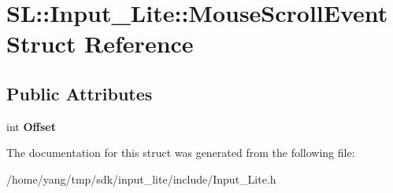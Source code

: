 \hypertarget{struct_s_l_1_1_input___lite_1_1_mouse_scroll_event}{}\section{SL\+:\+:Input\+\_\+\+Lite\+:\+:Mouse\+Scroll\+Event Struct Reference}
\label{struct_s_l_1_1_input___lite_1_1_mouse_scroll_event}
\subsection*{Public Attributes}
\begin{DoxyCompactItemize}
\item 
int {\bfseries Offset}\hypertarget{struct_s_l_1_1_input___lite_1_1_mouse_scroll_event_a08e15d1f6b5fc5f7c6b8c620dfe52584}{}\label{struct_s_l_1_1_input___lite_1_1_mouse_scroll_event_a08e15d1f6b5fc5f7c6b8c620dfe52584}

\end{DoxyCompactItemize}


The documentation for this struct was generated from the following file\+:\begin{DoxyCompactItemize}
\item 
/home/yang/tmp/sdk/input\+\_\+lite/include/Input\+\_\+\+Lite.\+h\end{DoxyCompactItemize}
